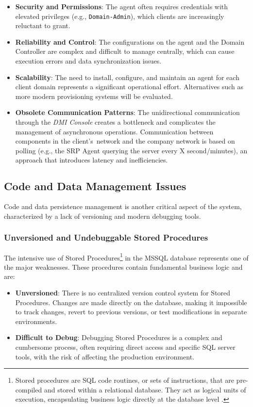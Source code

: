 \begin{itemize}
    \item \textbf{Security and Permissions}: The agent often requires credentials with elevated privileges (e.g., \texttt{Domain-Admin}), which clients are increasingly reluctant to grant.
    \item \textbf{Reliability and Control}: The configurations on the agent and the Domain Controller are complex and difficult to manage centrally, which can cause execution errors and data synchronization issues.
    \item \textbf{Scalability}: The need to install, configure, and maintain an agent for each client domain represents a significant operational effort. Alternatives such as more modern provisioning systems will be evaluated.
    \item \textbf{Obsolete Communication Patterns}: The unidirectional communication through the \textit{DMI Console} creates a bottleneck and complicates the management of asynchronous operations. Communication between components in the client's~network and the company network is based on polling (e.g., the SRP Agent querying the server every X second/minutes), an approach that introduces latency and inefficiencies.
\end{itemize}

\subsection{Code and Data Management Issues}

Code and data persistence management is another critical aspect of the system, characterized by a lack of versioning and modern debugging tools.

\subsubsection{Unversioned and Undebuggable Stored Procedures}
The intensive use of Stored Procedures\footnote{Stored procedures are SQL code routines, or sets of instructions, that are pre-compiled and stored within a relational database. They act as logical units of execution, encapsulating business logic directly at the database level \cite{relational-model-for-large-shared-data-banks}.} in the MSSQL database represents one of the major weaknesses. These procedures contain fundamental business logic and are:
\begin{itemize}
    \item \textbf{Unversioned}: There is no centralized version control system for Stored Procedures. Changes are made directly on the database, making it impossible to track changes, revert to previous versions, or test modifications in separate environments.
    \item \textbf{Difficult to Debug}: Debugging Stored Procedures is a complex and cumbersome process, often requiring direct access and specific SQL server tools, with the risk of affecting the production environment.
\end{itemize}

